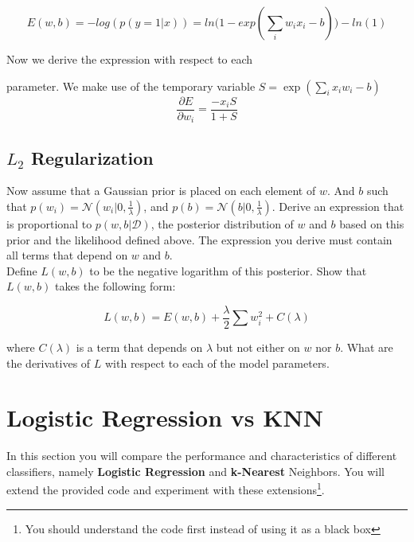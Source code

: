 \documentclass[a4paper]{tufte-handout}
\begin{document}
\begin{equation}
  E(w,b) = -log(p(y=1|x)) = ln\big(1- exp(\sum_i w_i x_i -b)\big) -ln(1)
\end{equation}

Now we derive the expression with respect to each

parameter. We make use of the temporary variable $S=\exp(\sum_i x_i w_i -b)$ \begin{equation} \frac{\partial E}{\partial w_i}  = \frac{-x_i S }{1+S} \end{equation} 

\subsection{$L_2$ Regularization}%
\label{sub:_l_2_regularization}

Now assume that a Gaussian prior is placed on each element of $w$. And $b$ such
that $p(w_i) = \mathcal{N}(w_i|0, \frac{1}{\lambda})$, and $p(b)=
\mathcal{N}(b|0, \frac{1}{\lambda})$. Derive an expression that is proportional
to $p(w,b|\mathcal{D})$, the posterior distribution of $w$ and $b$ based on this
prior and the likelihood defined above. The expression you derive must contain
all terms that depend on $w$ and $b$.\\

Define $L(w,b) $ to be the negative logarithm of this posterior. Show that
$L(w,b)$ takes the following form:

\begin{equation}
  L(w,b) = E(w,b) + \frac{\lambda}{2} \sum w_i^2 +C(\lambda)
\end{equation}

where $C(\lambda)$ is a term that depends on $\lambda$ but not either on $w$ nor
$b$. What are the derivatives of $L$ with respect to each of the model
parameters.



\section{Logistic Regression vs KNN}%
\label{sec:logistic_regression_vs_knn}

In this section you will compare the performance and characteristics of
different classifiers, namely \textbf{Logistic Regression} and
\textbf{k-Nearest} Neighbors. You will extend the provided code and experiment
with these extensions\footnote{You should understand the code first instead of
using it as a black box}.
\end{document}
